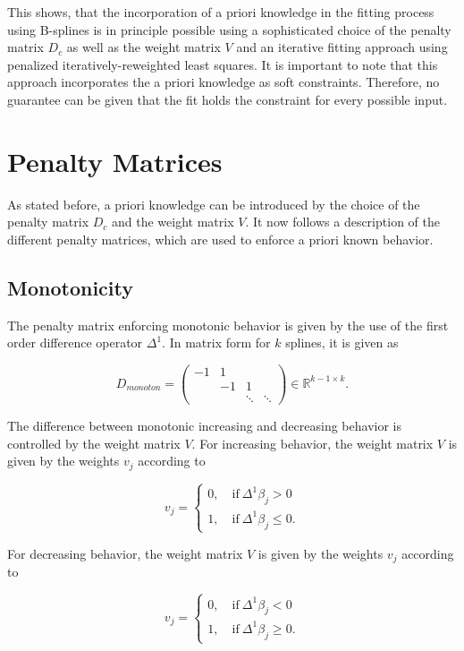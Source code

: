 \documentclass[10pt,a4paper]{article}
\begin{document}
	This shows, that the incorporation of a priori knowledge in the fitting process using B-splines is in principle possible using a sophisticated choice of the penalty matrix $D_c$ as well as the weight matrix $V$ and an iterative fitting approach using penalized iteratively-reweighted least squares. It is important to note that this approach incorporates the a priori knowledge as soft constraints. Therefore, no guarantee can be given that the fit holds the constraint for every possible input. 

						
	\section{Penalty Matrices}
	
	
	As stated before, a priori knowledge can be introduced by the choice of the penalty matrix $D_c$ and the weight matrix $V$. It now follows a description of the different penalty matrices, which are used to enforce a priori known behavior. 
	
	
	\subsection{Monotonicity}
	
	The penalty matrix enforcing monotonic behavior is given by the use of the first order difference operator $\Delta^1$. In matrix form for $k$ splines, it is given as
	
	$$D_{monoton} = \begin{pmatrix} -1 & 1  \\ 
									& -1 & 1 \\ 
									& & \ddots & \ddots  
				    \end{pmatrix} \in \mathbb{R}^{k-1 \times k}.$$
	
	The difference between monotonic increasing and decreasing behavior is controlled by the weight matrix $V$. For increasing behavior, the weight matrix $V$ is given by the weights $v_j$ according to
	
	$$v_j = \begin{cases} 0, \quad \text{if} \ \Delta^1\beta_j > 0 \\ 
					      1, \quad \text{if} \ \Delta^1\beta_j \le 0.
			\end{cases}$$
	
	For decreasing behavior, the weight matrix $V$ is given by the weights $v_j$ according to
	
	$$v_j = \begin{cases} 0, \quad \text{if} \ \Delta^1\beta_j < 0 \\ 
						  1, \quad \text{if} \ \Delta^1\beta_j \ge 0.
			\end{cases}$$
	
\end{document}
